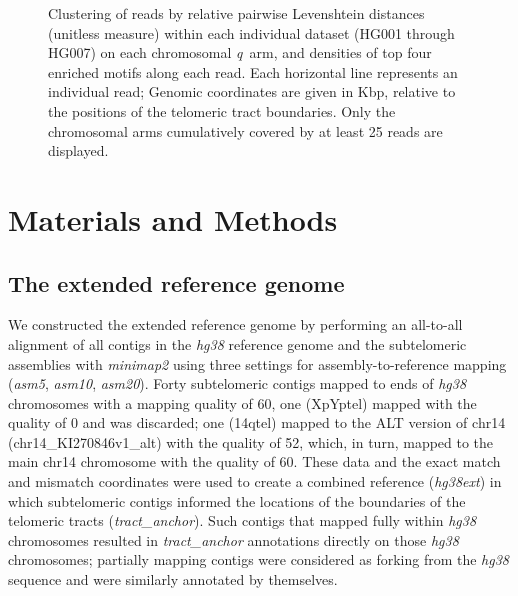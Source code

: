 \documentclass{article}
\begin{document}
\begin{figure}[h!]
                \caption{
                    \small Clustering of reads by relative pairwise Levenshtein distances (unitless measure)
                    within each individual dataset (HG001 through HG007)
                    on each chromosomal \mbox{\textit{q} arm},
                    and densities of top four enriched motifs along each read.
                    Each horizontal line represents an individual read;
                    Genomic coordinates are given in Kbp, relative to the positions of the telomeric tract boundaries.
                    Only the chromosomal arms cumulatively covered by at least 25 reads are displayed.
                }
                \label{fig:subject_haplotypes}
                \end{figure}

\section*{Materials and Methods}  \label{sec:methods}

\subsection*{The extended reference genome}
    We constructed the extended reference genome by performing an all-to-all alignment
        of all contigs in the \textit{hg38} reference genome \cite{grch38,hg38}
        and the subtelomeric assemblies \cite{riethman2014}
        with \textit{minimap2} \cite{minimap} using three settings
            for assembly-to-reference mapping (\textit{asm5}, \textit{asm10}, \textit{asm20}).
    Forty subtelomeric contigs mapped to ends of \textit{hg38} chromosomes with a mapping quality of 60,
        one (XpYptel) mapped with the quality of 0 and was discarded;
        one (14qtel) mapped to the ALT version of chr14 (chr14\_KI270846v1\_alt) with the quality of 52,
            which, in turn, mapped to the main chr14 chromosome with the quality of 60.
    These data and the exact match and mismatch coordinates were used to create a combined reference (\textit{hg38ext})
        in which subtelomeric contigs informed the locations of the boundaries of the telomeric tracts (\textit{tract\_anchor}).
    Such contigs that mapped fully within \textit{hg38} chromosomes resulted in \textit{tract\_anchor} annotations
            directly on those \textit{hg38} chromosomes;
        partially mapping contigs were considered as forking from the \textit{hg38} sequence and were similarly annotated by themselves.
\end{document}
